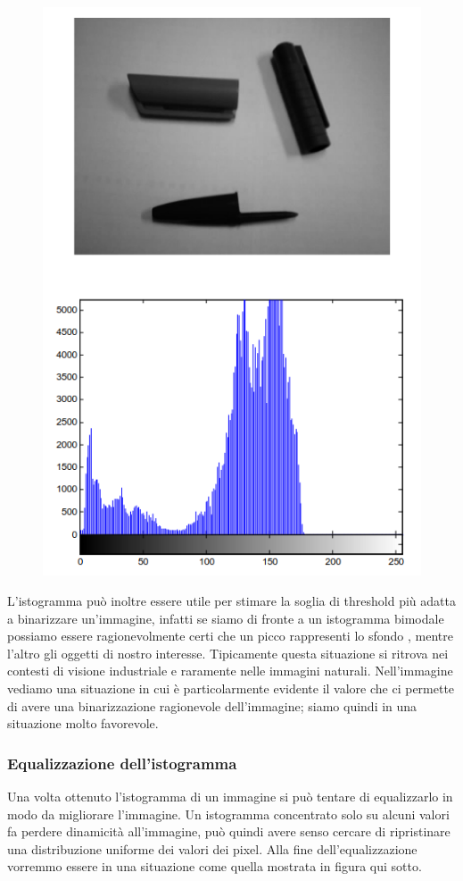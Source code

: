 \begin{figure}
	\vspace{-.3cm}
	\centering
	\includegraphics[width=.85\linewidth]{Picture/Histogram_Threshold}
\end{figure}
L'istogramma può inoltre essere utile per stimare la soglia di threshold più adatta a binarizzare un'immagine, infatti se siamo di fronte a un istogramma bimodale possiamo essere ragionevolmente certi che un picco rappresenti lo sfondo , mentre l'altro gli oggetti di nostro interesse. Tipicamente questa situazione si ritrova nei contesti di visione industriale e raramente nelle immagini naturali. Nell'immagine vediamo una situazione in cui è particolarmente evidente il valore che ci permette di avere una binarizzazione ragionevole dell'immagine; siamo quindi in una situazione molto favorevole.

\subsubsection{Equalizzazione dell'istogramma}
Una volta ottenuto l'istogramma di un immagine si può tentare di equalizzarlo in modo da migliorare l'immagine. Un istogramma concentrato solo su alcuni valori fa perdere dinamicità all'immagine, può quindi avere senso cercare di ripristinare una distribuzione uniforme dei valori dei pixel. Alla fine dell'equalizzazione vorremmo essere in una situazione come quella mostrata in figura qui sotto.

